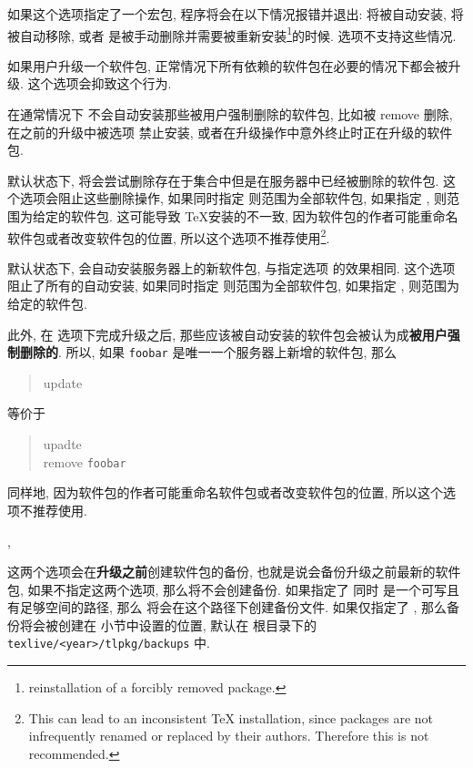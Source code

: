 \begin{description}
    如果这个选项指定了一个宏包, 程序将会在以下情况报错并退出:  将被自动安装,  将被自动移除, 或者  是被手动删除并需要被重新安装\footnote{reinstallation of a forcibly removed package.}的时候.  选项不支持这些情况. 
    \item {}\par
    如果用户升级一个软件包, 正常情况下所有依赖的软件包在必要的情况下都会被升级. 这个选项会抑致这个行为. 
    \item \hypertarget{op:-reinstall-forcibly-removed}{}\par
    在通常情况下 \tlmgr 不会自动安装那些被用户强制删除的软件包, 比如被 \ac{remove}  删除, 在之前的升级中被选项  禁止安装, 或者在升级操作中意外终止时正在升级的软件包. 
    \item {} \par
    默认状态下, \tlmgr 将会尝试删除存在于集合中但是在服务器中已经被删除的软件包. 这个选项会阻止这些删除操作, 如果同时指定  则范围为全部软件包, 如果指定 , 则范围为给定的软件包. 这可能导致 \TeX 安装的不一致, 因为软件包的作者可能重命名软件包或者改变软件包的位置, 所以这个选项不推荐使用\footnote{This can lead to an inconsistent TeX installation, since packages are not infrequently renamed or replaced by their authors. Therefore this is not recommended.}.
    \item {} \par
    默认状态下, \tlmgr 会自动安装服务器上的新软件包, 与指定选项  的效果相同. 这个选项阻止了所有的自动安装, 如果同时指定  则范围为全部软件包, 如果指定 , 则范围为给定的软件包.

    此外, 在  选项下完成升级之后, 那些应该被自动安装的软件包会被认为成\textbf{被用户强制删除的}. 所以, 如果 \texttt{foobar} 是唯一一个服务器上新增的软件包, 那么
    \begin{quote}
        \tlmgr{} \ac{update}  
    \end{quote}
    等价于
    \begin{quote}
        \tlmgr{} \ac{upadte} \\
        \tlmgr{} \ac{remove}  \texttt{foobar}
    \end{quote}
    同样地, 因为软件包的作者可能重命名软件包或者改变软件包的位置, 所以这个选项不推荐使用. 
    \item \hypertarget{op:backup}{,  }\par
    这两个选项会在\textbf{升级之前}创建软件包的备份, 也就是说会备份升级之前最新的软件包, 如果不指定这两个选项, 那么将不会创建备份. 如果指定了  同时  是一个可写且有足够空间的路径, 那么 \tlmgr 将会在这个路径下创建备份文件. 如果仅指定了 , 那么备份将会被创建在  小节中设置的位置, 默认在 \tl 根目录下的 \texttt{texlive/<year>/tlpkg/backups} 中.  


\end{description}
